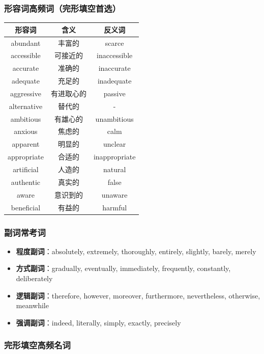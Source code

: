 \subsubsection{形容词高频词（完形填空首选）}

\begin{center}
\begin{tabular}{c|c|c}
\textbf{形容词} & \textbf{含义} & \textbf{反义词} \\ \toprule
abundant & 丰富的 & scarce \\
accessible & 可接近的 & inaccessible \\
accurate & 准确的 & inaccurate \\
adequate & 充足的 & inadequate \\
aggressive & 有进取心的 & passive \\
alternative & 替代的 & - \\
ambitious & 有雄心的 & unambitious \\
anxious & 焦虑的 & calm \\
apparent & 明显的 & unclear \\
appropriate & 合适的 & inappropriate \\
artificial & 人造的 & natural \\
authentic & 真实的 & false \\
aware & 意识到的 & unaware \\
beneficial & 有益的 & harmful \\
\bottomrule
\end{tabular}
\end{center}

\subsubsection{副词常考词}

\begin{itemize}
  \item \textbf{程度副词}：absolutely, extremely, thoroughly, entirely, slightly, barely, merely
  \item \textbf{方式副词}：gradually, eventually, immediately, frequently, constantly, deliberately
  \item \textbf{逻辑副词}：therefore, however, moreover, furthermore, nevertheless, otherwise, meanwhile
  \item \textbf{强调副词}：indeed, literally, simply, exactly, precisely
\end{itemize}

\subsubsection{完形填空高频名词}

